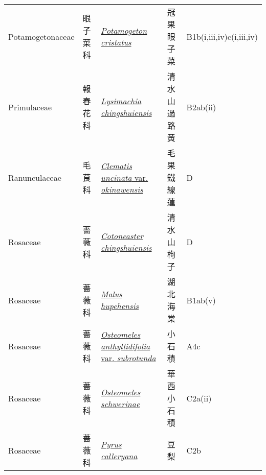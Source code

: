 {\begin{longtable}{L{2.5cm}L{2cm}L{5cm}L{2.5cm}L{3cm}}
    Potamogetonaceae & 眼子菜科 & \href{http://www.theplantlist.org/tpl1.1/search?q=Potamogeton+cristatus}{\textit{Potamogeton cristatus} } & 冠果眼子菜 & B1b(i,iii,iv)c(i,iii,iv)    \\
    Primulaceae & 報春花科 & \href{http://www.theplantlist.org/tpl1.1/search?q=Lysimachia+chingshuiensis}{\textit{Lysimachia chingshuiensis} } & 清水山過路黃 & B2ab(ii)    \\
    Ranunculaceae & 毛茛科 & \href{http://www.theplantlist.org/tpl1.1/search?q=Clematis+uncinata+var.+okinawensis}{\textit{Clematis uncinata} var. \textit{okinawensis} } & 毛果鐵線蓮 & D    \\
    Rosaceae & 薔薇科 & \href{http://www.theplantlist.org/tpl1.1/search?q=Cotoneaster+chingshuiensis}{\textit{Cotoneaster chingshuiensis} } & 清水山栒子 & D    \\
    Rosaceae & 薔薇科 & \href{http://www.theplantlist.org/tpl1.1/search?q=Malus+hupehensis}{\textit{Malus hupehensis} } & 湖北海棠 & B1ab(v)    \\
    Rosaceae & 薔薇科 & \href{http://www.theplantlist.org/tpl1.1/search?q=Osteomeles+anthyllidifolia+var.+subrotunda}{\textit{Osteomeles anthyllidifolia} var. \textit{subrotunda} } & 小石積 & A4c    \\
    Rosaceae & 薔薇科 & \href{http://www.theplantlist.org/tpl1.1/search?q=Osteomeles+schwerinae}{\textit{Osteomeles schwerinae} } & 華西小石積 & C2a(ii)    \\
    Rosaceae & 薔薇科 & \href{http://www.theplantlist.org/tpl1.1/search?q=Pyrus+calleryana}{\textit{Pyrus calleryana} } & 豆梨 & C2b    \\

\end{longtable}}
